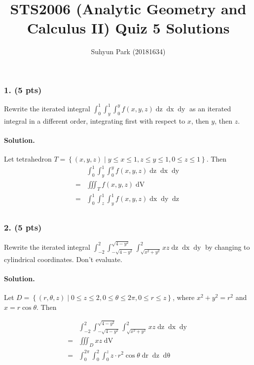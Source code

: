 \documentclass[runningheads]{llncs}
\begin{document}
\title{STS2006 (Analytic Geometry and Calculus II) \newline Quiz 5 Solutions}
\author{Suhyun Park (20181634)}
\maketitle

\subsubsection{1. (5 pts)} Rewrite the iterated integral $\displaystyle \int_0^1 \int_y^1 \int_0^y f\left(x, y, z\right) \mathop{dz} \mathop{dx} \mathop{dy}$ as an iterated integral in a different order, integrating first with respect to $x$, then $y$, then $z$.

\paragraph{Solution.} Let tetrahedron $T=\left\{\left(x, y, z\right)\middle| y\leq x \leq1, z\leq y \leq1, 0\leq z \leq1\right\}$. Then
\begin{align*}
	& \int_0^1 \int_y^1 \int_0^y f\left(x, y, z\right) \mathop{dz} \mathop{dx} \mathop{dy} \\
	=& \iiint_T f\left(x, y, z\right) \mathop{dV}\\
	=& \int_0^1 \int_z^1 \int_y^1 f\left(x, y, z\right) \mathop{dx} \mathop{dy} \mathop{dz} \\
\end{align*}
\par

\subsubsection{2. (5 pts)} Rewrite the iterated integral $\displaystyle \int_{-2}^2 \int_{-\sqrt{4-y^2}}^{\sqrt{4-y^2}} \int_{\sqrt{x^2+y^2}}^2 xz \mathop{dz} \mathop{dx} \mathop{dy}$ by changing to cylindrical coordinates. Don't evaluate.

\paragraph{Solution.} Let $D=\left\{\left(r, \theta, z\right)\middle| 0\leq z\leq 2, 0\leq\theta\leq2\pi, 0\leq r\leq z\right\}$, where $x^2+y^2=r^2$ and $x=r\cos\theta$. Then

\begin{align*}
	& \int_{-2}^2 \int_{-\sqrt{4-y^2}}^{\sqrt{4-y^2}} \int_{\sqrt{x^2+y^2}}^2 xz \mathop{dz} \mathop{dx} \mathop{dy}\\
	=& \iiint_D xz \mathop{dV}\\
	=& \int_0^{2\pi} \int_0^2 \int_0^z z\cdot r^2\cos\theta \mathop{dr} \mathop{dz} \mathop{d\theta}\\
\end{align*}
\end{document}
